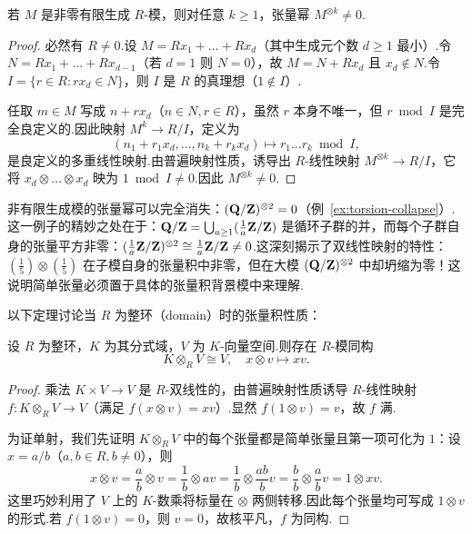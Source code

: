 \begin{theorem}\label{thm:fg-power-nonzero}
若 $M$ 是非零有限生成 $R$-模，则对任意 $k \geq 1$，张量幂 $M^{\otimes k} \neq 0$.
\end{theorem}

\begin{proof}
必然有 $R \neq 0$.设 $M = R x_1 + \dots + R x_d$（其中生成元个数 $d \geq 1$ 最小）.令 $N = R x_1 + \dots + R x_{d-1}$（若 $d = 1$ 则 $N = 0$），故 $M = N + R x_d$ 且 $x_d \notin N$.令 $I = \{r \in R : r x_d \in N\}$，则 $I$ 是 $R$ 的真理想（$1 \notin I$）.

任取 $m \in M$ 写成 $n + r x_d$（$n \in N, r \in R$），虽然 $r$ 本身不唯一，但 $r \bmod I$ 是完全良定义的.因此映射 $M^k \to R/I$，定义为
\[
  (n_1 + r_1 x_d, \dots, n_k + r_k x_d) \mapsto r_1 \dots r_k \bmod I,
\]
是良定义的多重线性映射.由普遍映射性质，诱导出 $R$-线性映射 $M^{\otimes k} \to R/I$，它将 $x_d \otimes \dots \otimes x_d$ 映为 $1 \bmod I \neq 0$.因此 $M^{\otimes k} \neq 0$.
\end{proof}

\begin{example}\label{ex:qz-powers}
非有限生成模的张量幂可以完全消失：$(\mathbf{Q}/\mathbf{Z})^{\otimes 2} = 0$（例~\ref{ex:torsion-collapse}）.这一例子的精妙之处在于：$\mathbf{Q}/\mathbf{Z} = \bigcup_{a \geq 1} (\frac{1}{a}\mathbf{Z}/\mathbf{Z})$ 是循环子群的并，而每个子群自身的张量平方非零：$(\frac{1}{a}\mathbf{Z}/\mathbf{Z})^{\otimes 2} \cong \frac{1}{a}\mathbf{Z}/\mathbf{Z} \neq 0$.这深刻揭示了双线性映射的特性：$(\frac{1}{5}) \otimes (\frac{1}{5})$ 在子模自身的张量积中非零，但在大模 $(\mathbf{Q}/\mathbf{Z})^{\otimes 2}$ 中却坍缩为零！这说明简单张量必须置于具体的张量积背景模中来理解.
\end{example}

以下定理讨论当 $R$ 为整环（domain）时的张量积性质：

\begin{theorem}\label{thm:frac-vector-tensor}
设 $R$ 为整环，$K$ 为其分式域，$V$ 为 $K$-向量空间.则存在 $R$-模同构
\[
  K \otimes_R V \cong V, \quad x \otimes v \mapsto xv.
\]
\end{theorem}

\begin{proof}
乘法 $K \times V \to V$ 是 $R$-双线性的，由普遍映射性质诱导 $R$-线性映射 $f \colon K \otimes_R V \to V$（满足 $f(x \otimes v) = xv$）.显然 $f(1 \otimes v) = v$，故 $f$ 满.

为证单射，我们先证明 $K \otimes_R V$ 中的每个张量都是简单张量且第一项可化为 $1$：设 $x = a/b$（$a, b \in R, b \neq 0$），则
\[
  x \otimes v = \frac{a}{b} \otimes v = \frac{1}{b} \otimes av = \frac{1}{b} \otimes \frac{ab}{b}v = \frac{b}{b} \otimes \frac{a}{b}v = 1 \otimes xv.
\]
这里巧妙利用了 $V$ 上的 $K$-数乘将标量在 $\otimes$ 两侧转移.因此每个张量均可写成 $1 \otimes v$ 的形式.若 $f(1 \otimes v) = 0$，则 $v = 0$，故核平凡，$f$ 为同构.
\end{proof}

